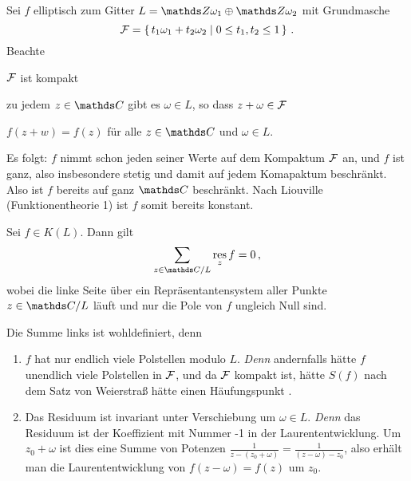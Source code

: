 \begin{bewe}
Sei $f$ elliptisch zum Gitter $L = \ZZ\omega_1 \oplus \ZZ\omega_2$ mit Grundmasche
\[
	\mathcal{F}
	= \left\{\,t_1\omega_1 + t_2\omega_2 \mid 0 \leq t_1, t_2 \leq 1\,\right\}
	\,.
\]
Beachte
\begin{enumerate*}
\item $\mathcal{F}$ ist kompakt
\item zu jedem $z\in\CC$ gibt es $\omega \in L$, so dass $z+\omega \in \mathcal{F}$
\item $f(z+w) = f(z)$ für alle $z \in \CC$ und $\omega \in L$.
\end{enumerate*}

Es folgt: $f$ nimmt schon jeden seiner Werte auf dem Kompaktum $\mathcal{F}$ an, und $f$ ist ganz, also insbesondere stetig und damit auf jedem Komapaktum beschränkt.
Also ist $f$ bereits auf ganz $\CC$ beschränkt.
Nach Liouville (Funktionentheorie 1) ist $f$ somit bereits konstant.
\end{bewe}

\begin{satz}\label{satz:liouville-2}
Sei $f \in K(L)$.
Dann gilt
\[
	\sum_{z\in\CC/L} \res_z f
	= 0
	\,,
\]
wobei die linke Seite über ein Repräsentantensystem aller Punkte $z\in \CC/L$ läuft und nur die Pole von $f$ ungleich Null sind.
\end{satz}

\begin{beme-noind}
Die Summe links ist wohldefiniert, denn
\begin{enumerate}
\item  $f$ hat nur endlich viele Polstellen modulo $L$.
\emph{Denn} andernfalls hätte $f$ unendlich viele Polstellen in $\mathcal{F}$, und da $\mathcal{F}$ kompakt ist, hätte $S(f)$ nach dem Satz von Weierstraß hätte einen Häufungspunkt \blitz.

\item Das Residuum ist invariant unter Verschiebung um $\omega \in L$.
\emph{Denn} das Residuum ist der Koeffizient mit Nummer -1 in der Laurententwicklung.
Um $z_0 + \omega$ ist dies eine Summe von Potenzen $\frac{1}{z-(z_0+\omega)} = \frac{1}{(z-\omega)-z_0}$, also erhält man die Laurententwicklung von $f(z-\omega) = f(z)$ um $z_0$.
\end{enumerate}
\end{beme-noind}

